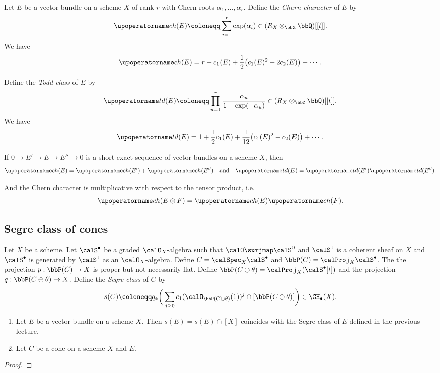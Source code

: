   \begin{example}
    Let $E$ be a vector bundle on a scheme $X$ of rank $r$ with Chern roots $\alpha_1, \dots, \alpha_r$.
    Define the \emph{Chern character} of $E$ by
    \[ \ch(E) \coloneqq \sum_{i=1}^r \exp(\alpha_i) \in (R_X \otimes_\bbZ \bbQ) [[t]]. \]
    We have 
    \[ \ch(E) = r + c_1(E) + \frac{1}{2} \big(c_1(E)^2 - 2 c_2(E)\big) + \cdots. \]

    Define the \emph{Todd class} of $E$ by
    \[ \td(E) \coloneqq \prod_{u=1}^r \frac{\alpha_u}{1 - \exp(-\alpha_u)} \in (R_X \otimes_\bbZ \bbQ) [[t]]. \]
    We have
    \[ \td(E) = 1 + \frac{1}{2} c_1(E) + \frac{1}{12} \big(c_1(E)^2 + c_2(E)\big) + \cdots. \]

    If $0 \to E' \to E \to E'' \to 0$ is a short exact sequence of vector bundles on a scheme $X$, then \[ \ch(E) = \ch(E') + \ch(E'') \quad \text{and} \quad \td(E) = \td(E') \td(E''). \]

    And the Chern character is multiplicative with respect to the tensor product, i.e. 
    \[ \ch(E \otimes F) = \ch(E) \ch(F). \]
  \end{example}


\subsection{Segre class of cones}


  \begin{definition}
    Let $X$ be a scheme. 
    Let $\calS^\bullet$ be a graded $\calO_X$-algebra such that $\calO \surjmap \calS^0$ and $\calS^1$ is a coherent sheaf on $X$ and $\calS^\bullet$ is generated by $\calS^1$ as an $\calO_X$-algebra.
    Define $C = \calSpec_X \calS^\bullet$ and $\bbP(C) = \calProj_X \calS^\bullet$.
    The the projection $p: \bbP(C) \to X$ is proper but not necessarily flat.
    Define $\bbP(C \oplus \theta) = \calProj_X (\calS^\bullet [t])$ and the projection $q: \bbP(C \oplus \theta) \to X$.
    Define the \emph{Segre class} of $C$ by
    \[ s(C) \coloneqq q_* \bigg( \sum_{j \geq 0} c_1(\calO_{\bbP(C \oplus \theta)}(1))^j \cap [\bbP(C \oplus \theta)] \bigg) \in \CH_\bullet(X). \]
  \end{definition}

  \begin{lemma}
    \begin{enumerate}
      \item Let $E$ be a vector bundle on a scheme $X$.
        Then $s(E) = s(E) \cap [X]$ coincides with the Segre class of $E$ defined in the previous lecture.
      \item Let $C$ be a cone on a scheme $X$ and $E$.
    \end{enumerate}
    \Yang{}
  \end{lemma}
  \begin{proof}
    \Yang{}
  \end{proof}
